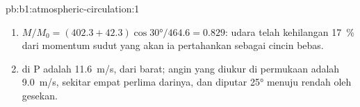 \begin{solution}{pb:b1:atmospheric-circulation:1}
\begin{enumerate}
        merata-ratakan  yang berliku atas semua .
  \item $M/M_0 = (402.3 + 42.3)\cos\ang{30}/464.6 = 0.829$: udara telah kehilangan
        \qty{17}{\percent} dari momentum sudut yang akan ia pertahankan sebagai cincin bebas.
  \item {} di P adalah \qty{11.6}{m/s}, dari barat; angin yang diukur
        di permukaan adalah \qty{9.0}{m/s}, sekitar empat perlima darinya, dan diputar
        \ang{25} menuju rendah oleh gesekan.
\end{enumerate}
\end{solution}
